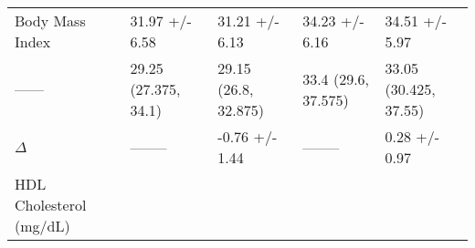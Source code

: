 \documentclass[]{article}
\begin{document}
\begin{longtable}[]{@{}lllll@{}}
\begin{minipage}[t]{0.15\columnwidth}
Body Mass Index\strut
\end{minipage} & \begin{minipage}[t]{0.20\columnwidth}\raggedright
31.97 +/- 6.58\strut
\end{minipage} & \begin{minipage}[t]{0.18\columnwidth}\raggedright
31.21 +/- 6.13\strut
\end{minipage} & \begin{minipage}[t]{0.18\columnwidth}\raggedright
34.23 +/- 6.16\strut
\end{minipage} & \begin{minipage}[t]{0.15\columnwidth}\raggedright
34.51 +/- 5.97\strut
\end{minipage}\tabularnewline
\begin{minipage}[t]{0.15\columnwidth}\raggedright
------\strut
\end{minipage} & \begin{minipage}[t]{0.20\columnwidth}\raggedright
29.25 (27.375, 34.1)\strut
\end{minipage} & \begin{minipage}[t]{0.18\columnwidth}\raggedright
29.15 (26.8, 32.875)\strut
\end{minipage} & \begin{minipage}[t]{0.18\columnwidth}\raggedright
33.4 (29.6, 37.575)\strut
\end{minipage} & \begin{minipage}[t]{0.15\columnwidth}\raggedright
33.05 (30.425, 37.55)\strut
\end{minipage}\tabularnewline
\begin{minipage}[t]{0.15\columnwidth}\raggedright
\(\Delta\)\strut
\end{minipage} & \begin{minipage}[t]{0.20\columnwidth}\raggedright
--------\strut
\end{minipage} & \begin{minipage}[t]{0.18\columnwidth}\raggedright
-0.76 +/- 1.44\strut
\end{minipage} & \begin{minipage}[t]{0.18\columnwidth}\raggedright
--------\strut
\end{minipage} & \begin{minipage}[t]{0.15\columnwidth}\raggedright
0.28 +/- 0.97\strut
\end{minipage}\tabularnewline
\begin{minipage}[t]{0.15\columnwidth}\raggedright
HDL Cholesterol (mg/dL)\strut
\end{minipage} & \begin{minipage}[t]{0.20\columnwidth}\raggedright

\end{minipage}
\end{longtable}
\end{document}
